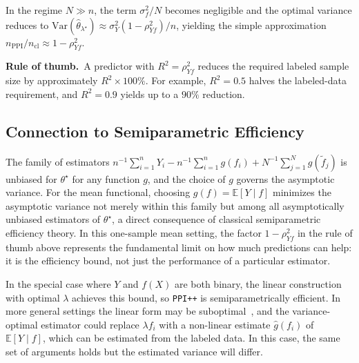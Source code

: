 \documentclass[12pt]{article}
\newcommand{\E}{\mathbb{E}}
\newcommand{\Var}{\mathrm{Var}}
\newcommand{\wh}{\widehat}
\newcommand{\wt}{\widetilde}
\begin{document}
\begin{corollary}\label{cor:rule-of-thumb}
In the regime $N \gg n$, the term $\sigma_f^2/N$ becomes negligible and
the optimal variance reduces to
$\Var(\wh{\theta}_{\lambda^\star}) \approx \sigma_Y^2(1 - \rho_{Yf}^2)/n$,
yielding the simple approximation
$n_{\mathrm{PPI}} / n_{\mathrm{cl}} \approx 1 - \rho_{Yf}^2$.
\end{corollary}

\begin{tcolorbox}
\textbf{Rule of thumb.}~A predictor with $R^2 = \rho_{Yf}^2$ reduces the
required labeled sample size by approximately $R^2 \times 100\%$. For
example, $R^2 = 0.5$ halves the labeled-data requirement, and $R^2 = 0.9$
yields up to a $90\%$ reduction.
\end{tcolorbox}

\subsection{Connection to Semiparametric Efficiency}
\label{sec:eif}

The family of estimators
$n^{-1}\sum_{i=1}^n Y_i - n^{-1}\sum_{i=1}^n g(f_i) + N^{-1}\sum_{j=1}^N g(\wt{f}_j)$
is unbiased for $\theta^\star$ for any function $g$, and the choice of $g$
governs the asymptotic variance. For the mean functional, choosing
$g(f) = \E[Y \mid f]$ minimizes the asymptotic variance not merely within
this family but among all asymptotically unbiased estimators of
$\theta^\star$, a direct consequence of classical semiparametric efficiency
theory. In this one-sample mean setting, the factor $1 - \rho_{Yf}^2$ in
the rule of thumb above represents the fundamental limit on how much
predictions can help: it is the efficiency bound, not just the performance of
a particular estimator.

In the special case where $Y$ and $f(X)$ are both binary, the linear
construction with optimal $\lambda$ achieves this bound, so
\texttt{PPI++} is semiparametrically efficient. In more general settings the
linear form may be suboptimal~\citep{chen2026unifying, ji2025predictions,xu2025unified,song2026demystifying}, and the variance-optimal estimator could replace $\lambda f_i$
with a non-linear estimate $\wh{g}(f_i)$ of $\E[Y \mid f]$, which can be
estimated from the labeled data. In this case, the same set of arguments holds but the estimated variance will differ.
\end{document}
